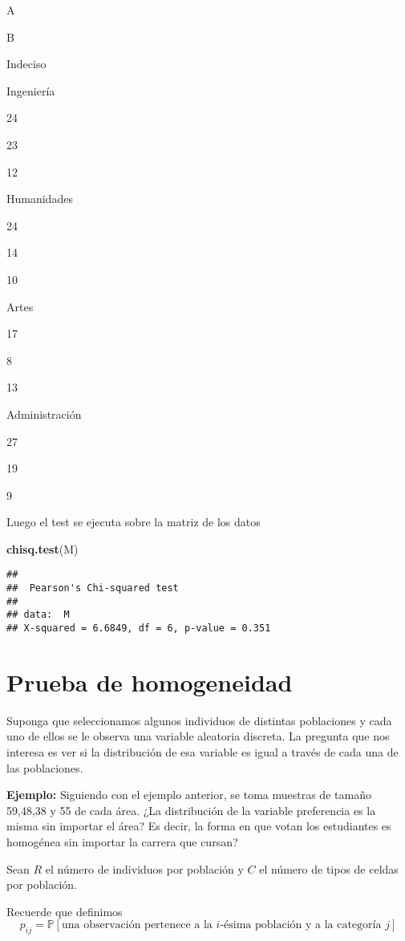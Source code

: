 \documentclass[
  12pt,
]{book}
\newenvironment{Shaded}{\begin{snugshade}}{\end{snugshade}}
\newcommand{\KeywordTok}[1]{\textcolor[rgb]{0.13,0.29,0.53}{\textbf{#1}}}
\newcommand{\NormalTok}[1]{#1}
\begin{document}
A

B

Indeciso

Ingeniería

24

23

12

Humanidades

24

14

10

Artes

17

8

13

Administración

27

19

9

Luego el test se ejecuta sobre la matriz de los datos

\begin{Shaded}
\begin{Highlighting}[]
\KeywordTok{chisq.test}\NormalTok{(M)}
\end{Highlighting}
\end{Shaded}

\begin{verbatim}
## 
##  Pearson's Chi-squared test
## 
## data:  M
## X-squared = 6.6849, df = 6, p-value = 0.351
\end{verbatim}

\hypertarget{prueba-de-homogeneidad}{%
\section{Prueba de homogeneidad}\label{prueba-de-homogeneidad}}

Suponga que seleccionamos algunos individuos de distintas poblaciones y cada
uno de ellos se le observa una variable aleatoria discreta. La pregunta que nos
interesa es ver si la distribución de esa variable es igual a través de cada una
de las poblaciones.

\textbf{Ejemplo:} Siguiendo con el ejemplo anterior, se toma muestras de tamaño
59,48,38 y 55 de cada área. ¿La distribución de la variable preferencia es la
misma sin importar el área? Es decir, la forma en que votan los estudiantes es
homogénea sin importar la carrera que cursan?

Sean \(R\) el número de individuos por población y \(C\) el número de tipos de celdas por
población.

Recuerde que definimos
\[p_{ij} = \mathbb P[\text{una observación pertenece a la }i\text{-ésima
población y a la categoría }j]\]
\end{document}
